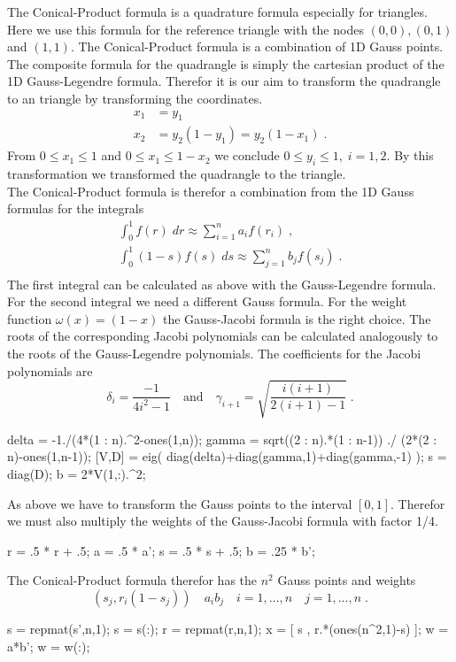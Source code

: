 \medskip
\noindent
The Conical-Product formula is a quadrature formula especially for triangles. Here we use this formula for the reference triangle with the nodes $(0,0),(0,1)$ and $(1,1)$. The Conical-Product formula is a combination of 1D Gauss points.\\
The composite formula for the quadrangle is simply the cartesian product of the 1D Gauss-Legendre formula.
Therefor it is our aim to transform the quadrangle to an triangle by transforming the coordinates.
\begin{equation*}
\begin{split}
    x_1 &= y_1\\
    x_2 &= y_2(1-y_1) = y_2(1-x_1)\; .
\end{split}
\end{equation*}
From $0\leq x_1\leq 1$ and $0\leq x_1\leq 1-x_2$ we conclude $0\leq y_i\leq 1,\; i=1,2$. By this transformation we transformed the quadrangle to the triangle.\\
The Conical-Product formula is therefor a combination from the 1D Gauss formulas for the integrals
\begin{equation*}
\begin{split}
    \int_0^1 f(r)\; dr \approx \sum_{i=1}^n a_i f(r_i) \; , \\
    \int_0^1 (1-s)f(s)\; ds \approx \sum_{j=1}^n b_j f(s_j) \; .\\
\end{split}
\end{equation*}
The first integral can be calculated as above with the Gauss-Legendre formula. For the second integral we need a different Gauss formula. For the weight function $\omega(x) = (1-x)$ the Gauss-Jacobi formula is the right choice. The roots of the corresponding Jacobi polynomials can be calculated analogously to the roots of the Gauss-Legendre polynomials. The coefficients for the Jacobi polynomials are
\begin{equation*}
\delta_i = \frac{-1}{4i^2-1}\quad\textrm{and}\quad \gamma_{i+1} = \sqrt{\frac{i(i+1)}{2(i+1)-1}}\; .
\end{equation*}
%
\begin{pcode}
delta = -1./(4*(1 : n).^2-ones(1,n));
gamma = sqrt((2 : n).*(1 : n-1)) ./ (2*(2 : n)-ones(1,n-1));
[V,D] = eig( diag(delta)+diag(gamma,1)+diag(gamma,-1) );
s = diag(D);
b = 2*V(1,:).^2;
\end{pcode}
As above we have to transform the Gauss points to the interval $[0,1]$. Therefor we must also
multiply the weights of the Gauss-Jacobi formula with factor 1/4.
\begin{pcode}
r = .5 * r + .5;
a = .5 * a';
s = .5 * s + .5;
b = .25 * b';
\end{pcode}
The Conical-Product formula therefor has the $n^2$ Gauss points and weights
\begin{equation*}
    ( s_j , r_i(1-s_j) ) \quad a_i b_j \quad i=1,\ldots,n\quad j=1,\ldots,n\;.
\end{equation*}
\begin{pcode}
s = repmat(s',n,1); s = s(:);
r = repmat(r,n,1);
x = [ s , r.*(ones(n^2,1)-s) ];
w = a*b';
w = w(:);
\end{pcode}
